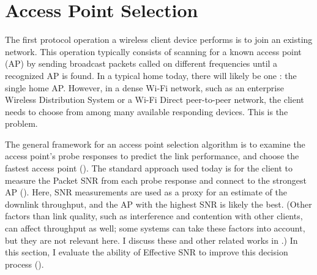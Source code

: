 \section{Access Point Selection}\label{sec:esnr_apsel}
The first protocol operation a wireless client device performs is to join an existing network. This operation typically consists of scanning for a known access point (AP) by sending broadcast packets called  on different frequencies until a recognized AP is found. In a typical home today, there will likely be one : the single home AP. However, in a dense Wi-Fi network, such as an enterprise Wireless Distribution System or a Wi-Fi Direct peer-to-peer network, the client needs to choose from among many available responding devices. This is the  problem.

The general framework for an access point selection algorithm is to examine the access point's probe responses to predict the link performance, and choose the fastest access point (). The standard approach used today is for the client to measure the Packet SNR from each probe response and connect to the strongest AP (). Here, SNR measurements are used as a proxy for an estimate of the downlink throughput, and the AP with the highest SNR is likely the best. (Other factors than link quality, such as interference and contention with other clients, can affect throughput as well; some systems can take these factors into account, but they are not relevant here. I discuss these and other related works in .)
In this section, I evaluate the ability of Effective SNR to improve this decision process ().


